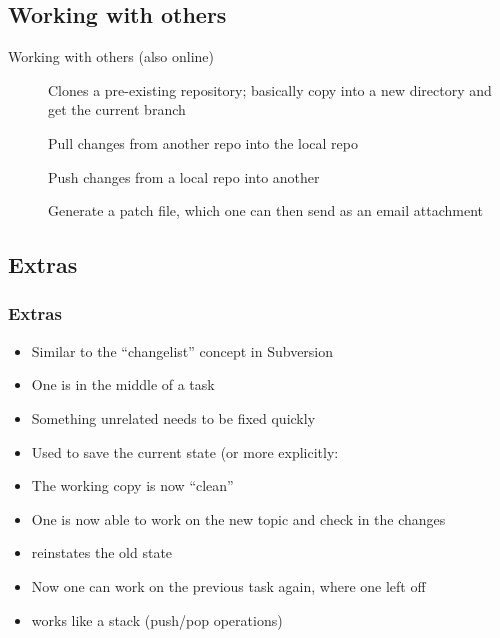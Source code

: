 \subsection{Working with others}
\begin{frame}{Working with others (also online)}
\begin{description}
\item[] Clones a pre-existing repository; basically copy
    into a new directory and get the current branch
\item[] Pull changes from another repo into the local
    repo
\item[] Push changes from a local repo into another
\item[] Generate a patch file, which one can then
    send as an email attachment
\end{description}
\end{frame}

\subsection{Extras}
\begin{frame}[fragile]
\frametitle{Extras}


\begin{itemize}
\item Similar to the \enquote{changelist} concept in Subversion
\item One is in the middle of a task
\item Something unrelated needs to be fixed quickly
\item Used  to save the current state (or more explicitly:
\item The working copy is now \enquote{clean}
\item One is now able to work on the new topic and check in the changes
\item {} reinstates the old state
\item Now one can work on the previous task again, where one left off
\item {} works like a stack (push/pop operations)
\end{itemize}

\end{frame}

